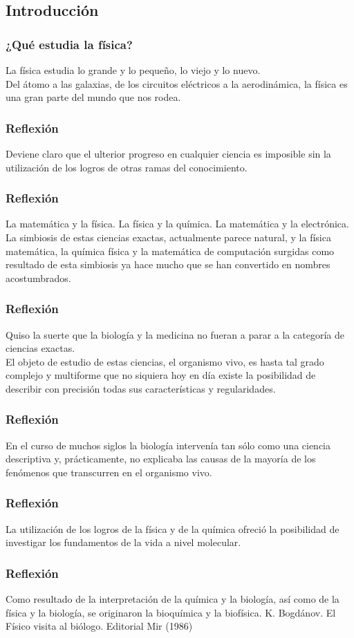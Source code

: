 \subsection{Introducción}
\begin{frame}   
\frametitle{¿Qué estudia la física?}
La física estudia lo grande y lo pequeño, lo viejo y lo nuevo. 
\\
\bigskip
Del átomo a las galaxias, de los circuitos eléctricos a la aerodinámica, la física es una gran parte del mundo que nos rodea.
\end{frame}
\begin{frame}
\frametitle{Reflexión}
Deviene claro que el ulterior progreso en cualquier ciencia es imposible sin la utilización de los logros de otras ramas del conocimiento.
\end{frame}
\begin{frame}
\frametitle{Reflexión}
La matemática y la física. La física y la química. La matemática y la electrónica.
\\
\bigskip
\pause
La simbiosis de estas ciencias exactas, actualmente parece natural, y la física matemática, la química física y la matemática de computación surgidas como resultado de esta simbiosis ya hace mucho que se han convertido en nombres acostumbrados.
\end{frame}
\begin{frame}
\frametitle{Reflexión}
Quiso la suerte que la biología y la medicina no fueran a parar a la categoría de ciencias exactas.
\\
\bigskip
El objeto de estudio de estas ciencias, el organismo vivo, es hasta tal grado complejo y multiforme que no siquiera hoy en día existe la posibilidad de describir con precisión todas sus características y regularidades.
\end{frame}
\begin{frame}
\frametitle{Reflexión}
En el curso de muchos siglos la biología intervenía tan sólo como una ciencia descriptiva y, prácticamente, no explicaba las causas de la mayoría de los fenómenos que transcurren en el organismo vivo.
\end{frame}
\begin{frame}
\frametitle{Reflexión}
La utilización de los logros de la física y de la química ofreció la posibilidad de investigar los fundamentos de la vida a nivel molecular.
\end{frame}
\begin{frame}
\frametitle{Reflexión}
Como resultado de la interpretación de la química y la biología, así como de la física y la biología, se originaron la bioquímica y la biofísica.
\pause
\vfill
K. Bogdánov. El Físico visita al biólogo. Editorial Mir (1986)
\end{frame}
